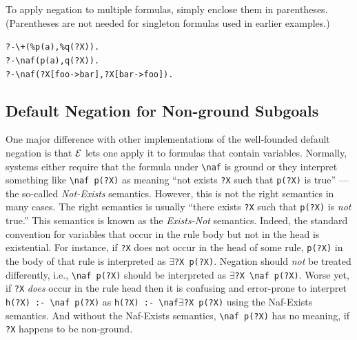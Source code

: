 \documentclass[11pt]{article}
\newcommand{\ERGO}{\mbox{\ensuremath{\cal{E}}\smaller{{\sc{RGO}}}}\xspace}
\newcommand{\FLSYSTEM}{\ERGO}
\newcommand{\bs}{\textbackslash}
\newcommand{\PLGNAF}{\mbox{\texttt{\bs}+}\xspace}
\newcommand{\RULELOGNAF}{{\texttt{{\bs}naf}}\xspace}
\begin{document}
To apply negation to multiple formulas, simply enclose them in
parentheses. (Parentheses are not needed for singleton formulas used in
earlier examples.)
\begin{alltt}
       ?- \PLGNAF(\%p(a),\%q(?X)).
       ?- \RULELOGNAF(p(a),q(?X)).
       ?- \RULELOGNAF(?X[foo->bar], ?X[bar->foo]).
\end{alltt}

\subsection{Default Negation for Non-ground Subgoals}
\label{sec-nonground-naf}

One major difference with other implementations of the well-founded default
negation is that \FLSYSTEM lets one apply it to formulas that contain variables.
Normally, systems either require that the formula under \texttt{\RULELOGNAF} is
ground or they interpret something like \texttt{\RULELOGNAF p(?X)} as meaning ``not
exists \texttt{?X} such that \texttt{p(?X)} is true'' --- the so-called
\emph{Not-Exists} semantics.
However, this is not the right semantics in many cases. The right semantics
is usually ``there exists \texttt{?X} such that \texttt{p(?X)} is
\emph{not} true.'' This semantics is known as the \emph{Exists-Not} semantics.
Indeed, the standard convention for variables that occur in the rule body
but not in the head is existential. For instance, if \texttt{?X} does not
occur in the head of some rule, \texttt{p(?X)} in the body  of that rule
is interpreted as \texttt{$\exists$?X p(?X)}. Negation should \emph{not}  be treated
differently, i.e., \texttt{\RULELOGNAF p(?X)}   should be interpreted as
\texttt{$\exists$?X \RULELOGNAF p(?X)}. Worse yet, if \texttt{?X} \emph{does} occur in the
rule head then it is confusing and error-prone to interpret
\texttt{h(?X) :- \RULELOGNAF p(?X)} as  \texttt{h(?X) :- \RULELOGNAF $\exists$?X p(?X)} using the Naf-Exists
semantics. And without the Naf-Exists semantics, \texttt{\RULELOGNAF p(?X)}  has no
meaning, if \texttt{?X} happens to be non-ground.
\end{document}
